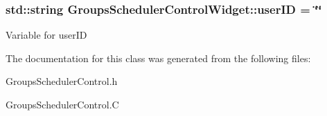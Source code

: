 \subsubsection[{\texorpdfstring{user\+ID}{userID}}]{\setlength{\rightskip}{0pt plus 5cm}std\+::string Groups\+Scheduler\+Control\+Widget\+::user\+ID = \char`\"{}\char`\"{}\hspace{0.3cm}{\ttfamily [private]}}\hypertarget{classGroupsSchedulerControlWidget_a5973c1e905540b541584f3fd7057432e}{}\label{classGroupsSchedulerControlWidget_a5973c1e905540b541584f3fd7057432e}
Variable for user\+ID 

The documentation for this class was generated from the following files\+:\begin{DoxyCompactItemize}
\item 
Groups\+Scheduler\+Control.\+h\item 
Groups\+Scheduler\+Control.\+C\end{DoxyCompactItemize}
